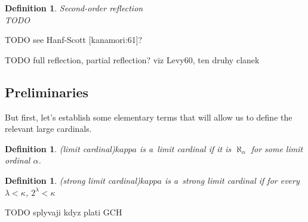 \documentclass[12pt,a4paper]{article}
\newtheorem{definition}[theorem]{Definition}
\newcommand{\sub}{\subseteq}
\begin{document}
\begin{definition}{Second-order reflection}\label{def:reflection}\\
TODO
\end{definition}

TODO see Hanf-Scott [kanamori:61]?

TODO full reflection, partial reflection? viz Levy60, ten druhy clanek







\subsection{Preliminaries}

But first, let's establish some elementary terms that will allow us to define the relevant large cardinals.

\begin{definition}(limit cardinal)\label{def:limit}
$kappa$ is a~\emph{limit cardinal} if it is $\aleph_\alpha$ for some limit ordinal $\alpha$.
\end{definition}

\begin{definition}(strong limit cardinal)\label{def:strong_limit}
$kappa$ is a~\emph{strong limit cardinal} if for every $\lambda < \kappa$, $2^\lambda < \kappa$
\end{definition}


TODO splyvaji kdyz plati GCH
\
\end{document}
